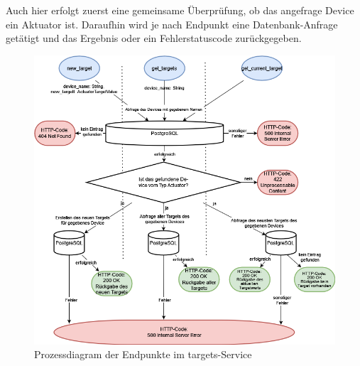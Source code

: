         Auch hier erfolgt zuerst eine gemeinsame Überprüfung, ob das angefrage Device ein Aktuator ist.
        Daraufhin wird je nach Endpunkt eine Datenbank-Anfrage getätigt und das Ergebnis oder ein Fehlerstatuscode zurückgegeben.

        \begin{figure}[H]
            \includegraphics[width=1.05\linewidth]{images/prozessdiagramm_backend_targets.drawio.png}
            \centering
            \caption{Prozessdiagram der Endpunkte im targets-Service}
            \label{fig:backend-service-targets}
        \end{figure}

\pagebreak

